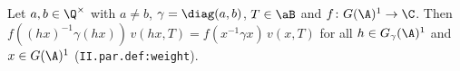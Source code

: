 Let $a,b\in\Q^\times$ with $a\neq b$, $\gamma=\diag(a,b)$, $T\in\aB$ and $f\colon G(\A)^1\to\C$. Then
$f((hx)^{-1}\gamma(hx))\,v(hx,T)=f(x^{-1}\gamma x)\,v(x,T)$ for all $h\in G_\gamma(\A)^1$ and $x\in G(\A)^1$ (\texttt{II.par.def:weight}).
